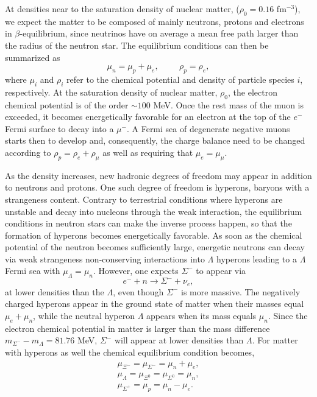 At densities near to the saturation density of nuclear
matter, ($\rho_0=0.16$ fm$^{-3}$), 
we expect the matter to be composed of mainly neutrons, protons 
and electrons in $\beta$-equilibrium, since neutrinos have on average a
mean free path larger than the radius of the neutron star. The
equilibrium conditions can then be summarized as
\begin{equation}
    \mu_n=\mu_p+\mu_e,  \hspace{1cm} \rho_p = \rho_e,
     \label{eq:npebetaequilibrium}
\end{equation}
where $\mu_i$ and $\rho_i$ refer to the chemical potential and density
of particle species $i$, respectively.
At the saturation density of nuclear matter, $\rho_0$,
the electron chemical potential is
of the order $\sim 100$ MeV.
Once the rest mass of the muon is exceeded, it becomes
energetically favorable for an electron at the top
of the $e^-$ Fermi surface to decay into a
$\mu^-$. A Fermi sea of degenerate negative muons starts then to develop
and, consequently, the charge balance need to be changed
according to $\rho_p = \rho_e+\rho_{\mu}$
as well as requiring that $\mu_e = \mu_{\mu}$.

As the density increases, new hadronic degrees of freedom may 
appear in addition
to neutrons and protons.
One such degree of freedom is hyperons, baryons with a
strangeness content.
Contrary to terrestrial conditions where hyperons are unstable and decay
into nucleons through the weak interaction, the equilibrium conditions
in neutron stars can make the inverse process happen, so that the
formation of hyperons becomes energetically favorable.     
As soon as the chemical potential
of the neutron becomes sufficiently large, energetic neutrons
can decay via weak strangeness non-conserving interactions
into $\Lambda$ hyperons leading to a $\Lambda$ Fermi sea
with $\mu_{\Lambda}=\mu_n$.
However, one expects $\Sigma^-$ to appear via
\begin{equation}
    e^-+n \rightarrow \Sigma^- +\nu_e,
\end{equation}
at lower densities than the $\Lambda$, even though $\Sigma^-$ is more
massive. The negatively charged hyperons
appear in the ground state of matter when their masses
equal $\mu_e+\mu_n$, while the neutral hyperon $\Lambda$
appears when its mass equals $\mu_n$. Since the
electron chemical potential in matter is larger than
the mass difference $m_{\Sigma^-}-m_{\Lambda}= 81.76$ MeV,
$\Sigma^-$ will appear at lower densities than $\Lambda$.
For matter with hyperons as well
the chemical equilibrium condition becomes,
\begin{eqnarray}
    \mu_{\Xi^-}=\mu_{\Sigma^-} = \mu_n + \mu_e, \nonumber \\
    \mu_{\Lambda} = \mu_{\Xi^0}=\mu_{\Sigma^0} = \mu_n , \nonumber \\
    \mu_{\Sigma^+} = \mu_p = \mu_n - \mu_e .
    \label{eq:beta_baryonicmatter}
\end{eqnarray}

